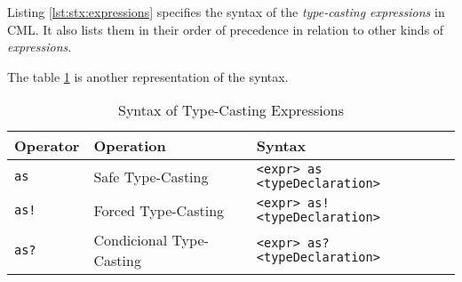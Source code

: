 Listing \ref{lst:stx:expressions} specifies the syntax of
the \emph{type-casting expressions} in CML.
It also lists them in their order of precedence
in relation to other kinds of \emph{expressions}.

The table \ref{tab:type-casting-syntax} is another representation of the syntax.

\begin{table}[H]
\centering
\begin{tabular}
{ l l l }
\hline
Operator & Operation & Syntax \\
\hline
\verb|as| & Safe Type-Casting & \verb|<expr> as <typeDeclaration>| \\
\verb|as!| & Forced Type-Casting & \verb|<expr> as! <typeDeclaration>| \\
\verb|as?| & Condicional Type-Casting & \verb|<expr> as? <typeDeclaration>|
\end{tabular}
\caption{Syntax of Type-Casting Expressions}
\label{tab:type-casting-syntax}
\end{table}
